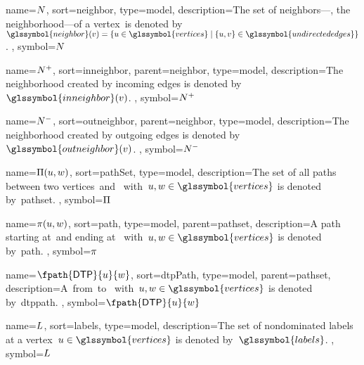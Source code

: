 {
    name={\ensuremath{ \neighbor }},
    sort={neighbor},
    type={model},
    description={The set of neighbors---\ie, the neighborhood---of a
vertex~\vertexb is denoted by~$\glssymbol{neighbor}(\vertexb)=
\{\vertexa\in\glssymbol{vertices}\mid\{\vertexa,\vertexb\}\in
\glssymbol{undirectededges}\}$.
    },
    symbol={\ensuremath{ \neighbor }}
}

{
    name={\ensuremath{ \inneighbor }},
    sort={inneighbor},
    parent={neighbor},
    type={model},
    description={The neighborhood created by incoming edges is denoted
    by~$\glssymbol{inneighbor}(\vertexb)$.
    },
    symbol={\ensuremath{ \inneighbor }}
}

{
    name={\ensuremath{ \outneighbor }},
    sort={outneighbor},
    parent={neighbor},
    type={model},
    description={The neighborhood created by outgoing edges is
    denoted by~$\glssymbol{outneighbor}(\vertexb)$.
    },
    symbol={\ensuremath{ \outneighbor }}
}

{
    name={\ensuremath{ \paths(\vertexa,\vertexc) }},
    sort={pathSet},
    type={model},
    description={The set of all paths between two vertices~\vertexa and~\vertexc
    with~$\vertexa,\vertexc\in\glssymbol{vertices}$ is denoted by~\gls{pathset}.
    },
    symbol={\ensuremath{ \paths }}
}

{
    name={\ensuremath{ \pathu(\vertexa,\vertexc) }},
    sort={path},
    type={model},
    parent={pathset},
    description={A path starting at~\vertexa and ending at~\vertexc
    with~$\vertexa,\vertexc\in\glssymbol{vertices}$ is denoted by~\gls{path}.
    },
    symbol={\ensuremath{ \pathu }}
}

{
    name={\ensuremath{ \fpath{\dtp}{\vertexa}{\vertexc} }},
    sort={dtpPath},
    type={model},
    parent={pathset},
    description={A~\dtp from~\vertexa to~\vertexb
    with~$\vertexa,\vertexc\in\glssymbol{vertices}$ is denoted by~\gls{dtppath}.
    },
    symbol={\ensuremath{ \fpath{\dtp}{\vertexa}{\vertexc} }}
}

{
    name={\ensuremath{ \labels }},
    sort={labels},
    type={model},
    description={The set of nondominated labels at a
    vertex~$\vertexa\in\glssymbol{vertices}$ is denoted
    by~$\glssymbol{labels}$.
    },
    symbol={\ensuremath{ \labels }}
}

